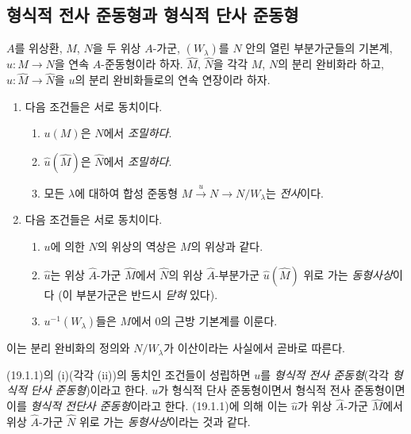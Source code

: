 \subsection{형식적 전사 준동형과 형식적 단사 준동형}
\label{subsection:0.19.1-fr}

\begin{proposition}[19.1.1]
\label{0.19.1.1-fr}
$A$를 위상환, $M$, $N$을 두 위상 $A$-가군,
$(W_\lambda)$를 $N$ 안의 열린 부분가군들의 기본계,
$u:M\to N$을 연속 $A$-준동형이라 하자. $\widehat M$,
$\widehat N$을 각각 $M$, $N$의 분리 완비화라 하고,
$\widehat u:\widehat M\to\widehat N$을 $u$의 분리 완비화들로의
연속 연장이라 하자.
\begin{enumerate}
  \item[(i)] 다음 조건들은 서로 동치이다.
  \begin{enumerate}
    \item[a)] $u(M)$은 $N$에서 \emph{조밀하다}.
    \item[a$'$)] $\widehat u(\widehat M)$은 $\widehat N$에서
    \emph{조밀하다}.
    \item[a$''$)] 모든 $\lambda$에 대하여 합성 준동형
    $M\xrightarrow{u}N\to N/W_\lambda$는 \emph{전사}이다.
  \end{enumerate}
  \item[(ii)] 다음 조건들은 서로 동치이다.
  \begin{enumerate}
    \item[b)] $u$에 의한 $N$의 위상의 역상은 $M$의 위상과 같다.
    \item[b$'$)] $\widehat u$는 위상 $\widehat A$-가군
    $\widehat M$에서 $\widehat N$의 위상 $\widehat A$-부분가군
    $\widehat u(\widehat M)$ 위로 가는 \emph{동형사상}이다
    (이 부분가군은 반드시 \emph{닫혀} 있다).
    \item[b$''$)] $u^{-1}(W_\lambda)$들은 $M$에서 $0$의 근방
    기본계를 이룬다.
  \end{enumerate}
\end{enumerate}
이는 분리 완비화의 정의와 $N/W_\lambda$가 이산이라는 사실에서
곧바로 따른다.
\end{proposition}

\begin{env}[19.1.2]
\label{0.19.1.2-fr}
(19.1.1)의 (i)(각각 (ii))의 동치인 조건들이 성립하면 $u$를
\emph{형식적 전사 준동형}(각각 \emph{형식적 단사 준동형})이라고
한다. $u$가 형식적 단사 준동형이면서 형식적 전사 준동형이면 이를
\emph{형식적 전단사 준동형}이라고 한다. (19.1.1)에 의해 이는
$\widehat u$가 위상 $\widehat A$-가군 $\widehat M$에서 위상
$\widehat A$-가군 $\widehat N$ 위로 가는 \emph{동형사상}이라는
것과 같다.
\end{env}

